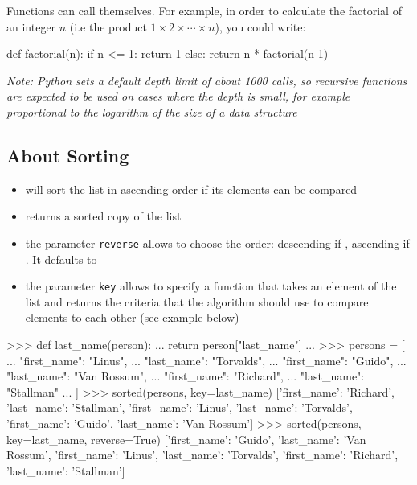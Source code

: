 \documentclass[twocolumn]{article}
\begin{document}
Functions can call themselves. For example, in order to calculate the factorial of an integer $n$ (i.e the product $1 \times 2 \times \cdots \times n$), you could write:

\begin{python}
def factorial(n):
    if n <= 1:
        return 1
    else:
        return n * factorial(n-1)
\end{python}

\textit{Note: Python sets a default depth limit of about 1000 calls, so recursive functions are expected to be used on cases where the depth is small, for example proportional to the logarithm of the size of a data structure}

\subsection{About Sorting}\label{aboutsorting}

\begin{itemize}
\item {} will sort the list in ascending order if its elements can be compared
\item {} returns a sorted copy of the list
\item the parameter \texttt{reverse} allows to choose the order: descending if , ascending if . It defaults to 
\item the parameter \texttt{key} allows to specify a function that takes an element of the list and returns the criteria that the algorithm should use to compare elements to each other (see example below)
\end{itemize}

\begin{python}
>>> def last_name(person):
...     return person["last_name"]
... 
>>> persons = [
...     {"first_name": "Linus",
...      "last_name": "Torvalds"},
...     {"first_name": "Guido",
...      "last_name": "Van Rossum"},
...     {"first_name": "Richard",
...      "last_name": "Stallman"}
... ]
>>> sorted(persons, key=last_name)
[{'first_name': 'Richard',
  'last_name': 'Stallman'},
 {'first_name': 'Linus',
  'last_name': 'Torvalds'},
 {'first_name': 'Guido',
  'last_name': 'Van Rossum'}]
>>> sorted(persons, key=last_name, reverse=True)
[{'first_name': 'Guido',
 'last_name': 'Van Rossum'},
 {'first_name': 'Linus',
  'last_name': 'Torvalds'},
 {'first_name': 'Richard',
  'last_name': 'Stallman'}]
\end{python}
\end{document}
